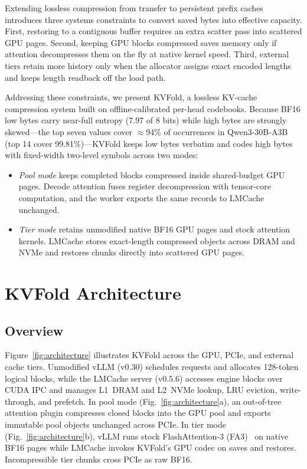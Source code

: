 \documentclass[conference]{IEEEtran}
\begin{document}
Extending lossless compression from transfer to persistent prefix caches
introduces three systems constraints to convert saved bytes into effective
capacity. First, restoring to a contiguous buffer requires an extra scatter
pass into scattered GPU pages. Second, keeping GPU blocks compressed saves
memory only if attention decompresses them on the fly at native kernel speed.
Third, external tiers retain more history only when the allocator assigns exact
encoded lengths and keeps length readback off the load path.

Addressing these constraints, we present KVFold, a lossless KV-cache
compression system built on offline-calibrated per-head codebooks. Because BF16
low bytes carry near-full entropy (7.97 of 8 bits) while high bytes are
strongly skewed---the top seven values cover $\approx$94\% of occurrences in
Qwen3-30B-A3B (top 14 cover 99.81\%)---KVFold keeps low bytes verbatim and
codes high bytes with fixed-width two-level symbols across two modes:
\begin{itemize}
\item \emph{Pool mode} keeps completed blocks compressed inside shared-budget
GPU pages. Decode attention fuses register decompression with tensor-core
computation, and the worker exports the same records to LMCache unchanged.
\item \emph{Tier mode} retains unmodified native BF16 GPU pages and stock
attention kernels. LMCache stores exact-length compressed objects across DRAM
and NVMe and restores chunks directly into scattered GPU pages.
\end{itemize}

\section{KVFold Architecture}
\label{sec:design}
\subsection{Overview}
Figure~\ref{fig:architecture} illustrates KVFold across the GPU, PCIe, and
external cache tiers. Unmodified vLLM (v0.30) schedules requests and allocates
128-token logical blocks, while the LMCache server (v0.5.6) accesses engine
blocks over CUDA IPC and manages L1~DRAM and L2~NVMe lookup, LRU eviction,
write-through, and prefetch. In pool mode (Fig.~\ref{fig:architecture}a), an
out-of-tree attention plugin compresses closed blocks into the GPU pool and
exports immutable pool objects unchanged across PCIe. In tier mode
(Fig.~\ref{fig:architecture}b), vLLM runs stock FlashAttention-3
(FA3)~\cite{fa3neurips} on native BF16 pages while LMCache invokes KVFold's GPU
codec on saves and restores. Incompressible tier chunks cross PCIe as raw BF16.
\end{document}
